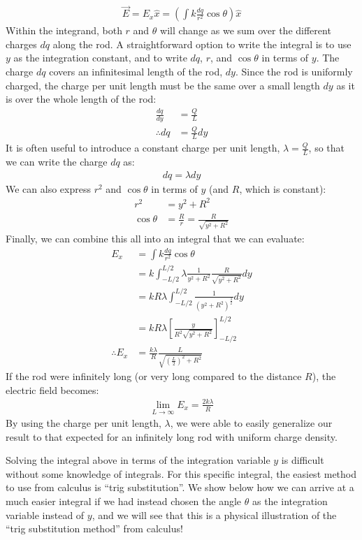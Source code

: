 \begin{example}
\begin{align*}
\vec E = E_x \hat x = \left(\int k\frac{dq}{r^2}\cos\theta\right) \hat x
\end{align*}
Within the integrand, both $r$ and $\theta$ will change as we sum over the different charges $dq$ along the rod. A straightforward option to write the integral is to use $y$ as the integration constant, and to write $dq$, $r$, and $\cos\theta$ in terms of $y$. The charge $dq$ covers an infinitesimal length of the rod, $dy$. Since the rod is uniformly charged, the charge per unit length must be the same over a small length $dy$ as it is over the whole length of the rod:
\begin{align*}
\frac{dq}{dy}&=\frac{Q}{L}\\
\therefore dq &= \frac{Q}{L} dy
\end{align*}
It is often useful to introduce a constant charge per unit length, $\lambda=\frac{Q}{L}$, so that we can write the charge $dq$ as:
\begin{align*}
dq = \lambda dy
\end{align*}
We can also express $r^2$ and $\cos\theta$ in terms of $y$ (and $R$, which is constant):
\begin{align*}
r^2 &= y^2+R^2\\
\cos\theta&=\frac{R}{r}=\frac{R}{\sqrt{y^2+R^2}}
\end{align*}
Finally, we can combine this all into an integral that we can evaluate:
\begin{align*}
 E_x &=\int k\frac{dq}{r^2}\cos\theta\\
 &=k\int_{-L/2}^{L/2} \lambda \frac{1}{y^2+R^2}\frac{R}{\sqrt{y^2+R^2}} dy\\
 &=kR\lambda\int_{-L/2}^{L/2} \frac{1}{(y^2+R^2)^{\frac{3}{2}}} dy\\
 &=kR\lambda \left[  \frac{y}{R^2\sqrt{y^2+R^2}}\right]_{-L/2}^{L/2}\\
 \therefore E_x &= \frac{k\lambda}{R}\frac{L}{\sqrt{\left(\frac{L}{2}\right)^2+R^2}}  
\end{align*}
If the rod were infinitely long (or very long compared to the distance $R$), the electric field becomes:
\begin{align*}
\lim_{L\to\infty}E_x=\frac{2k\lambda}{R}
\end{align*}
By using the charge per unit length, $\lambda$, we were able to easily generalize our result to that expected for an infinitely long rod with uniform charge density.

Solving the integral above in terms of the integration variable $y$ is difficult without some knowledge of integrals. For this specific integral, the easiest method to use from calculus is ``trig substitution''. We show below how we can arrive at a much easier integral if we had instead chosen the angle $\theta$ as the integration variable instead of $y$, and we will see that this is a physical illustration of the ``trig substitution method'' from calculus!


\end{example}
